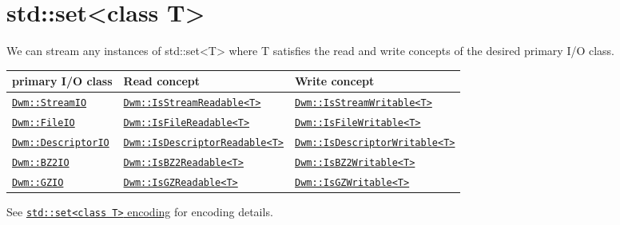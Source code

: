 \begin{minipage}{\textwidth}
\section{\ttfamily std::set<class T>}
We can stream any instances of {\ttfamily std::set<T>} where
{\ttfamily T} satisfies the read and write concepts of the desired
primary I/O class.
\vspace{1ex}

\begin{tabular}{lll}
  \textbf{primary I/O class} & \textbf{Read concept} & \textbf{Write concept} \\ \hline
  \hyperref[section:DwmStreamIOClass]{\texttt{Dwm::StreamIO}} & \hyperref[concept:DwmIsStreamReadable]{\texttt{Dwm::IsStreamReadable<T>}} & \hyperref[concept:DwmIsStreamWritable]{\texttt{Dwm::IsStreamWritable<T>}} \\
  \hyperref[section:DwmFileIOClass]{\texttt{Dwm::FileIO}} & \hyperref[concept:DwmIsFileReadable]{\texttt{Dwm::IsFileReadable<T>}} & \hyperref[concept:DwmIsFileWritable]{\texttt{Dwm::IsFileWritable<T>}} \\
  \hyperref[section:DwmDescriptorIOClass]{\texttt{Dwm::DescriptorIO}} & \hyperref[concept:DwmIsDescriptorReadable]{\texttt{Dwm::IsDescriptorReadable<T>}} & \hyperref[concept:DwmIsDescriptorWritable]{\texttt{Dwm::IsDescriptorWritable<T>}} \\
  \hyperref[section:DwmBZ2IOClass]{\texttt{Dwm::BZ2IO}} & \hyperref[concept:DwmIsBZ2Readable]{\texttt{Dwm::IsBZ2Readable<T>}} & \hyperref[concept:DwmIsBZ2Writable]{\texttt{Dwm::IsBZ2Writable<T>}} \\
  \hyperref[section:DwmGZIOClass]{\texttt{Dwm::GZIO}} & \hyperref[concept:DwmIsGZReadable]{\texttt{Dwm::IsGZReadable<T>}} & \hyperref[concept:DwmIsGZWritable]{\texttt{Dwm::IsGZWritable<T>}} \\
\end{tabular}
\vspace{1ex}

See \hyperref[encoding:stdSet]{\texttt{std::set<class T>} encoding} for
encoding details.
\end{minipage}

